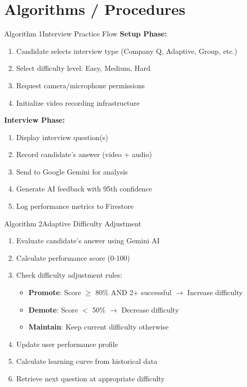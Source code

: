\documentclass{beamer}
\begin{document}
\section{Algorithms / Procedures}
\begin{frame}{Algorithm 1}{Interview Practice Flow}
\textbf{Setup Phase:}
\begin{enumerate}
    \item Candidate selects interview type (Company Q, Adaptive, Group, etc.)
    \item Select difficulty level: Easy, Medium, Hard
    \item Request camera/microphone permissions
    \item Initialize video recording infrastructure
\end{enumerate}

\vspace{3pt}
\textbf{Interview Phase:}
\begin{enumerate}
    \item Display interview question(s)
    \item Record candidate's answer (video + audio)
    \item Send to Google Gemini for analysis
    \item Generate AI feedback with 95th confidence
    \item Log performance metrics to Firestore
\end{enumerate}
\end{frame}

\begin{frame}{Algorithm 2}{Adaptive Difficulty Adjustment}
\begin{enumerate}
    \item Evaluate candidate's answer using Gemini AI
    \item Calculate performance score (0-100)
    \item Check difficulty adjustment rules:
    \begin{itemize}
        \item \textbf{Promote}: Score $\geq$ 80\% AND 2+ successful $\rightarrow$ Increase difficulty
        \item \textbf{Demote}: Score $<$ 50\% $\rightarrow$ Decrease difficulty
        \item \textbf{Maintain}: Keep current difficulty otherwise
    \end{itemize}
    \item Update user performance profile
    \item Calculate learning curve from historical data
    \item Retrieve next question at appropriate difficulty
\end{enumerate}
\end{frame}
\end{document}
